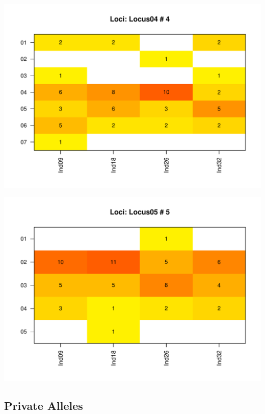 \documentclass[a4paper]{scrartcl}\usepackage[]{graphicx}\usepackage[]{color}
\makeatletter
\def\maxwidth{ %
  \ifdim\Gin@nat@width>\linewidth
    \linewidth
  \else
    \Gin@nat@width
  \fi
}
\newenvironment{knitrout}{}{} %
\makeatother
\begin{document}
\begin{knitrout}
\includegraphics[width=\maxwidth]{PopGenReport-heatmap-4} 

\includegraphics[width=\maxwidth]{PopGenReport-heatmap-5} 

\end{knitrout}
\FloatBarrier

\subsection{Private Alleles}

\FloatBarrier
\end{document}
